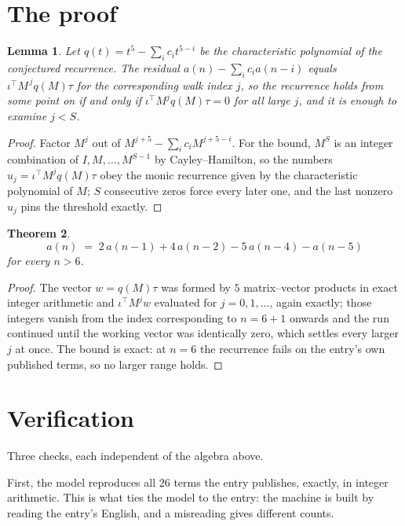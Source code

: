 \documentclass[11pt,a4paper]{article}
\theoremstyle{plain}
\newtheorem{theorem}{Theorem}
\newtheorem{lemma}[theorem]{Lemma}
\theoremstyle{definition}
\begin{document}
\section{The proof}

\begin{lemma}\label{lem:crit}
Let $q(t)=t^{5}-\sum_i c_it^{5-i}$ be the characteristic polynomial of the
conjectured recurrence. The residual $a(n)-\sum_ic_ia(n-i)$ equals
$\iota^{\!\top}M^{\,j}q(M)\tau$ for the corresponding walk index $j$, so the recurrence
holds from some point on if and only if $\iota^{\!\top}M^{j}q(M)\tau=0$ for all large $j$,
and it is enough to examine $j<S$.
\end{lemma}

\begin{proof}
Factor $M^{j}$ out of $M^{j+5}-\sum_ic_iM^{j+5-i}$. For the bound, $M^{S}$
is an integer combination of $I,M,\dots,M^{S-1}$ by Cayley--Hamilton, so the numbers
$u_j=\iota^{\!\top}M^{j}q(M)\tau$ obey the monic recurrence given by the characteristic
polynomial of $M$; $S$ consecutive zeros force every later one, and the last nonzero $u_j$
pins the threshold exactly.
\end{proof}

\begin{theorem}
\[
a(n)\;=\;2\,a(n-1) + 4\,a(n-2) - 5\,a(n-4) - a(n-5)
\]
for every $n>6$.
\end{theorem}

\begin{proof}
The vector $w=q(M)\tau$ was formed by $5$ matrix--vector products in exact integer
arithmetic and $\iota^{\!\top}M^{j}w$ evaluated for $j=0,1,\dots$, again exactly; those
integers vanish from the index corresponding to $n=6+1$ onwards and the run continued
until the working vector was identically zero, which settles every larger $j$ at once. The bound is exact: at $n=6$ the recurrence fails on the entry's own published terms, so no larger range holds.
\end{proof}

\section{Verification}

Three checks, each independent of the algebra above.

First, the model reproduces all $26$ terms the entry publishes, exactly, in integer
arithmetic. This is what ties the model to the entry: the machine is built by reading the
entry's English, and a misreading gives different counts.
\end{document}
